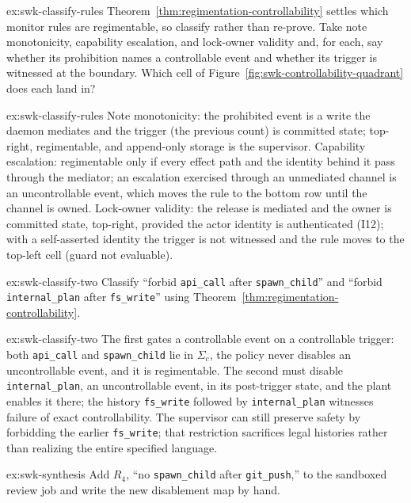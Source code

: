\documentclass[11pt,a4paper]{article}
\theoremstyle{definition}
\theoremstyle{remark}
\begin{document}
\begin{pdexercise}[kind=Trace,rating=2]{ex:swk-classify-rules}
Theorem~\ref{thm:regimentation-controllability} settles which monitor rules are regimentable, so classify rather than re-prove. Take note monotonicity, capability escalation, and lock-owner validity and, for each, say whether its prohibition names a controllable event and whether its trigger is witnessed at the boundary. Which cell of Figure~\ref{fig:swk-controllability-quadrant} does each land in?
\end{pdexercise}
\begin{pdsolution}{ex:swk-classify-rules}
Note monotonicity: the prohibited event is a write the daemon mediates and the trigger (the previous count) is committed state; top-right, regimentable, and append-only storage is the supervisor. Capability escalation: regimentable only if every effect path and the identity behind it pass through the mediator; an escalation exercised through an unmediated channel is an uncontrollable event, which moves the rule to the bottom row until the channel is owned. Lock-owner validity: the release is mediated and the owner is committed state, top-right, provided the actor identity is authenticated (I12); with a self-asserted identity the trigger is not witnessed and the rule moves to the top-left cell (guard not evaluable).
\end{pdsolution}
\begin{pdexercise}[kind=Check,rating=1]{ex:swk-classify-two}
Classify ``forbid \texttt{api\_call} after \texttt{spawn\_child}'' and ``forbid \texttt{internal\_plan} after \texttt{fs\_write}'' using Theorem~\ref{thm:regimentation-controllability}.
\end{pdexercise}
\begin{pdsolution}{ex:swk-classify-two}
The first gates a controllable event on a controllable trigger: both \texttt{api\_call} and \texttt{spawn\_child} lie in $\Sigma_c$, the policy never disables an uncontrollable event, and it is regimentable. The second must disable \texttt{internal\_plan}, an uncontrollable event, in its post-trigger state, and the plant enables it there; the history \texttt{fs\_write} followed by \texttt{internal\_plan} witnesses failure of exact controllability. The supervisor can still preserve
safety by forbidding the earlier \texttt{fs\_write}; that restriction sacrifices
legal histories rather than realizing the entire specified language.
\end{pdsolution}
\begin{pdexercise}[kind=Trace,rating=2]{ex:swk-synthesis}
Add $R_4$, ``no \texttt{spawn\_child} after \texttt{git\_push},'' to the sandboxed review job and write the new disablement map by hand.
\end{pdexercise}
\end{document}
